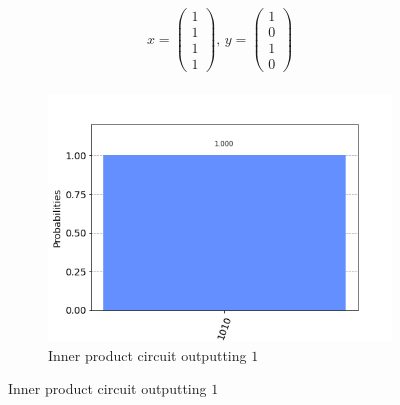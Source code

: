 \documentclass[10pt]{proc}
\theoremstyle{definition}
\theoremstyle{remark}
\begin{document}
\begin{figure}[!ht]
  \centering
  \begin{minipage}[b]{0.45\textwidth}
    \begin{align*}
      x = \begin{pmatrix}1\\1\\1\\1\end{pmatrix} \text{, } y = \begin{pmatrix}1\\0\\1\\0\end{pmatrix} \\
    \end{align*}
  \end{minipage}
  \begin{subfigure}[b]{0.3\textwidth}
    \includegraphics[width=\textwidth]{results/inner_product_true.png} 
    \caption{Inner product circuit outputting $1$}
    \label{fig:inner_product_example_true}
  \end{subfigure}


\end{figure}
\end{document}
